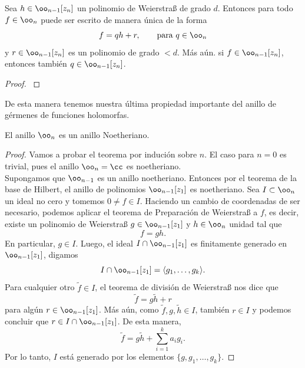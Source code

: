 	\begin{theorem}
		Sea $h\in\oo_{n-1}[z_n]$ un polinomio de Weierstraß de grado $d$. Entonces para todo $f\in\oo_n$ puede ser escrito de manera única de la forma
		\begin{equation*}
			f=qh+r,\qquad\text{para }q\in \oo_n 
		\end{equation*} 
		y $r\in\oo_{n-1}[z_n]$ es un polinomio de grado $<d$. Más aún. si $f\in\oo_{n-1}[z_n]$, entonces también $q\in\oo_{n-1}[z_n]$.
	\end{theorem}
	\begin{proof}
		\parencite[Cap. 1, Sec, 1.1, Prop. 1.1.17]{huybrechts2005complex}
	\end{proof}
	
	De esta manera tenemos nuestra última propiedad importante del anillo de gérmenes de funciones holomorfas.
	
	\begin{theorem}\label{anillonoetheriano}
		El anillo $\oo_{n}$ es un anillo Noetheriano.
	\end{theorem}
	\begin{proof}
		Vamos a probar el teorema por indución sobre $n$. El caso para $n=0$ es trivial, pues el anillo $\oo_n=\cc$ es noetheriano.\\
		Supongamos que $\oo_{n-1}$ es un anillo noetheriano. Entonces por el teorema de la base de Hilbert, el anillo de polinomios $\oo_{n-1}[z_1]$ es noetheriano. Sea $I\subset\oo_n$ un ideal no cero y tomemos $0\neq f\in I$. Haciendo un cambio de coordenadas de ser necesario, podemos aplicar el teorema de Preparación de Weierstraß a $f$, es decir, existe un polinomio de Weierstraß $g\in \oo_{n-1}[z_1]$ y $h\in\oo_n$ unidad tal que
		\begin{equation*}
			f=gh.
		\end{equation*}
		En particular, $g\in I$. Luego, el ideal $I\cap \oo_{n-1}[z_1]$ es finitamente generado en $\oo_{n-1}[z_1]$, digamos
		\begin{equation*}
			I\cap \oo_{n-1}[z_1]=\langle g_1,\dots,g_k \rangle.
		\end{equation*}
		Para cualquier otro $\tilde{f}\in I$, el teorema de división de Weierstraß nos dice que 
		\begin{equation*}
			\tilde{f}=g\tilde{h}+r
		\end{equation*}
		para algún $r\in\oo_{n-1}[z_1]$. Más aún, como $\tilde{f},g,\tilde{h}\in I$, también $r\in I$ y podemos concluir que $r\in I\cap \oo_{n-1}[z_1]$. De esta manera,
		\begin{equation*}
			\tilde{f}=g\tilde{h}+\sum_{i=1}^{k}a_ig_i.
		\end{equation*}
		Por lo tanto, $I$ está generado por los elementos $\{g,g_1,\dots,g_k\}$.
	\end{proof}
	
